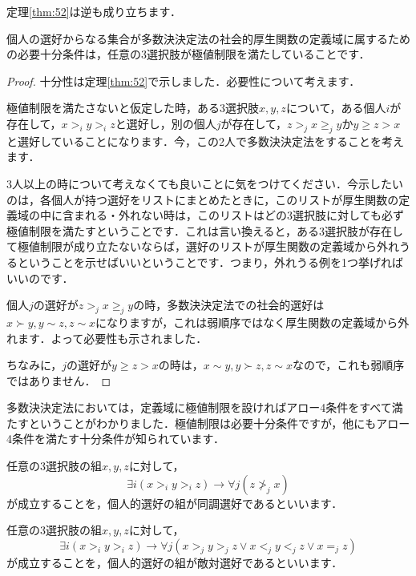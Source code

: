 定理\ref{thm:52}は逆も成り立ちます．

\begin{thm}
    個人の選好からなる集合が多数決決定法の社会的厚生関数の定義域に属するための必要十分条件は，任意の3選択肢が極値制限を満たしていることです．
\end{thm}

\begin{proof}
十分性は定理\ref{thm:52}で示しました．必要性について考えます．

極値制限を満たさないと仮定した時，ある3選択肢$x,y,z$について，ある個人$i$が存在して，$x >_i y >_i z$と選好し，別の個人$j$が存在して，$z >_j x \geq_j y$か$y \geq z > x$と選好していることになります．今，この2人で多数決決定法をすることを考えます．

3人以上の時について考えなくても良いことに気をつけてください．今示したいのは，各個人が持つ選好をリストにまとめたときに，このリストが厚生関数の定義域の中に含まれる・外れない時は，このリストはどの3選択肢に対しても必ず極値制限を満たすということです．これは言い換えると，ある3選択肢が存在して極値制限が成り立たないならば，選好のリストが厚生関数の定義域から外れうるということを示せばいいということです．つまり，外れうる例を1つ挙げればいいのです．

個人$j$の選好が$z >_j x \geq_j y$の時，多数決決定法での社会的選好は$x \succ y, y \sim z, z \sim x$になりますが，これは弱順序ではなく厚生関数の定義域から外れます．よって必要性も示されました．

ちなみに，$j$の選好が$y \geq z > x$の時は，$x \sim y, y \succ z, z \sim x$なので，これも弱順序ではありません．
\end{proof}

多数決決定法においては，定義域に極値制限を設ければアロー4条件をすべて満たすということがわかりました．極値制限は必要十分条件ですが，他にもアロー4条件を満たす十分条件が知られています．

\begin{dfn}[同調選好]
    任意の3選択肢の組$x,y,z$に対して，
    \begin{equation*}
        \exists i (x >_i y >_ i z) \to \forall j (z \not >_j x) 
    \end{equation*}
    が成立することを，個人的選好の組が同調選好であるといいます．
\end{dfn}

\begin{dfn}[敵対選好]
    任意の3選択肢の組$x,y,z$に対して，
    \begin{equation*}
        \exists i (x >_i y >_i z) \to \forall j (x >_j y >_j z \lor x <_j y <_j z \lor x =_j z)
    \end{equation*}
    が成立することを，個人的選好の組が敵対選好であるといいます．
\end{dfn}

